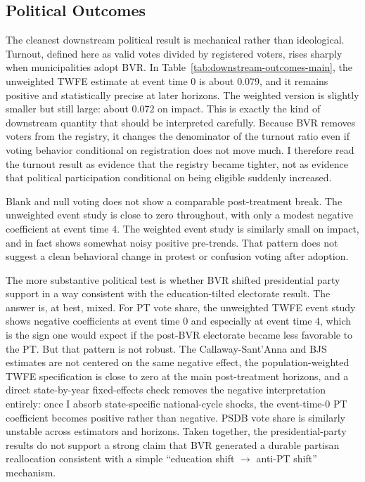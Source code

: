 

\subsection{Political Outcomes}

The cleanest downstream political result is mechanical rather than ideological. Turnout, defined here as valid votes divided by registered voters, rises sharply when municipalities adopt BVR. In Table~\ref{tab:downstream-outcomes-main}, the unweighted TWFE estimate at event time $0$ is about $0.079$, and it remains positive and statistically precise at later horizons. The weighted version is slightly smaller but still large: about $0.072$ on impact. This is exactly the kind of downstream quantity that should be interpreted carefully. Because BVR removes voters from the registry, it changes the denominator of the turnout ratio even if voting behavior conditional on registration does not move much. I therefore read the turnout result as evidence that the registry became tighter, not as evidence that political participation conditional on being eligible suddenly increased.

Blank and null voting does not show a comparable post-treatment break. The unweighted event study is close to zero throughout, with only a modest negative coefficient at event time $4$. The weighted event study is similarly small on impact, and in fact shows somewhat noisy positive pre-trends. That pattern does not suggest a clean behavioral change in protest or confusion voting after adoption.

The more substantive political test is whether BVR shifted presidential party support in a way consistent with the education-tilted electorate result. The answer is, at best, mixed. For PT vote share, the unweighted TWFE event study shows negative coefficients at event time $0$ and especially at event time $4$, which is the sign one would expect if the post-BVR electorate became less favorable to the PT. But that pattern is not robust. The Callaway-Sant'Anna and BJS estimates are not centered on the same negative effect, the population-weighted TWFE specification is close to zero at the main post-treatment horizons, and a direct state-by-year fixed-effects check removes the negative interpretation entirely: once I absorb state-specific national-cycle shocks, the event-time-$0$ PT coefficient becomes positive rather than negative. PSDB vote share is similarly unstable across estimators and horizons. Taken together, the presidential-party results do not support a strong claim that BVR generated a durable partisan reallocation consistent with a simple ``education shift $\rightarrow$ anti-PT shift'' mechanism.


